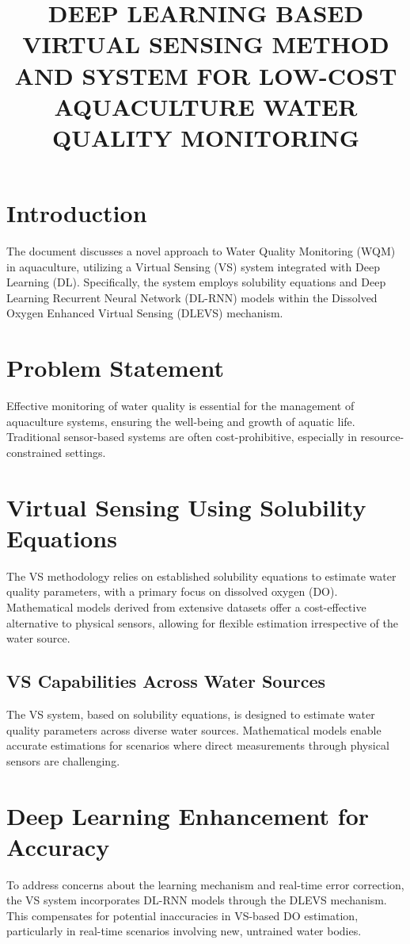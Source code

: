 \documentclass[a4paper, 11pt]{article}
\begin{document}
	
\title{DEEP LEARNING BASED VIRTUAL SENSING METHOD AND SYSTEM FOR LOW-COST AQUACULTURE WATER QUALITY MONITORING}
\maketitle
\section*{Introduction}
The document discusses a novel approach to Water Quality Monitoring (WQM) in aquaculture, utilizing a Virtual Sensing (VS) system integrated with Deep Learning (DL). Specifically, the system employs solubility equations and Deep Learning Recurrent Neural Network (DL-RNN) models within the Dissolved Oxygen Enhanced Virtual Sensing (DLEVS) mechanism.

\section*{Problem Statement}
Effective monitoring of water quality is essential for the management of aquaculture systems, ensuring the well-being and growth of aquatic life. Traditional sensor-based systems are often cost-prohibitive, especially in resource-constrained settings.

\section*{Virtual Sensing Using Solubility Equations}
The VS methodology relies on established solubility equations to estimate water quality parameters, with a primary focus on dissolved oxygen (DO). Mathematical models derived from extensive datasets offer a cost-effective alternative to physical sensors, allowing for flexible estimation irrespective of the water source.

\subsection*{VS Capabilities Across Water Sources}
The VS system, based on solubility equations, is designed to estimate water quality parameters across diverse water sources. Mathematical models enable accurate estimations for scenarios where direct measurements through physical sensors are challenging.

\section*{Deep Learning Enhancement for Accuracy}
To address concerns about the learning mechanism and real-time error correction, the VS system incorporates DL-RNN models through the DLEVS mechanism. This compensates for potential inaccuracies in VS-based DO estimation, particularly in real-time scenarios involving new, untrained water bodies.
\end{document}
